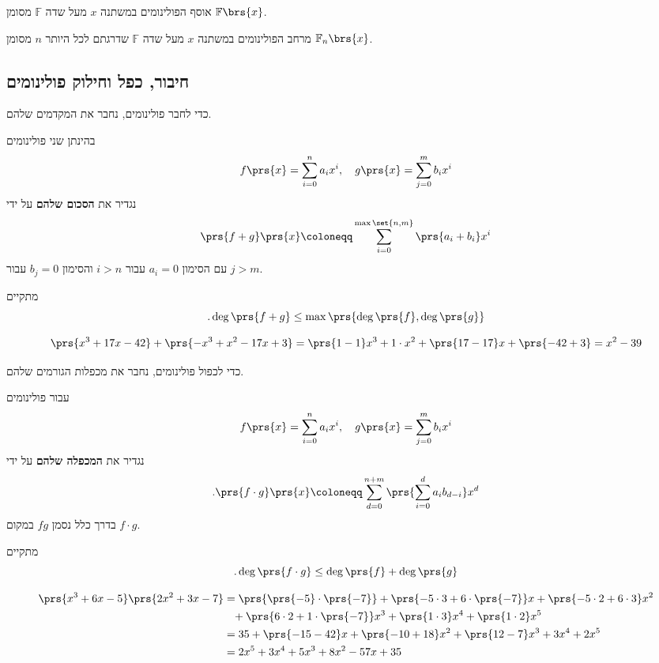 \documentclass[article, 10pt,oneside]{article}
\renewcommand{\emph}[1]{\textbf{#1}}
\begin{document}
\begin{notation}
אוסף הפולינומים במשתנה
$x$
מעל שדה
$\mathbb{F}$
מסומן
$\mathbb{F}\brs{x}$.
\end{notation}

\begin{notation}
מרחב הפולינומים במשתנה
$x$
מעל שדה
$\mathbb{F}$
שדרגתם לכל היותר
$n$
מסומן
$\mathbb{F}_n\brs{x}$.
\end{notation}

\subsection*{חיבור, כפל וחילוק פולינומים}

כדי לחבר פולינומים, נחבר את המקדמים שלהם.

\begin{definition}
בהינתן שני פולינומים
\[f\prs{x} = \sum_{i = 0}^n a_i x^i, \quad g\prs{x} = \sum_{j=0}^m b_i x^i\]
נגדיר את
\emph{הסכום שלהם}
על ידי
\[\prs{f+g}\prs{x} \coloneqq \sum_{i=0}^{\max\set{n,m}} \prs{a_i + b_i} x^i\]
עם הסימון
$a_i = 0$
עבור
$i > n$
והסימון
$b_j = 0$
עבור
$j > m$.
\end{definition}

\begin{remark}
מתקיים
\[\text{.}\deg\prs{f+g} \leq \max\prs{\deg\prs{f}, \deg\prs{g}}\]
\end{remark}

\begin{example}
\[\prs{x^3 + 17x - 42} + \prs{-x^3 + x^2 - 17x + 3} = \prs{1-1}x^3 + 1 \cdot x^2 + \prs{17-17}x + \prs{-42 + 3} = x^2 - 39\]
\end{example}

כדי לכפול פולינומים, נחבר את מכפלות הגורמים שלהם.

\begin{definition}
עבור פולינומים
\[f\prs{x} = \sum_{i = 0}^n a_i x^i, \quad g\prs{x} = \sum_{j = 0}^m b_i x^i\]
נגדיר את
\emph{המכפלה שלהם}
על ידי
\[\text{.} \prs{f \cdot g}\prs{x} \coloneqq \sum_{d = 0}^{n+m} \prs{\sum_{i = 0}^d a_i b_{d-i}} x^d\]
בדרך כלל נסמן
$fg$
במקום
$f \cdot g$.
\end{definition}

\begin{remark}
מתקיים
\[\text{.} \deg\prs{f \cdot g} \leq \deg\prs{f} + \deg\prs{g}\]
\end{remark}

\begin{example}
\begin{align*}
\prs{x^3 + 6x - 5} \prs{2 x^2 + 3 x - 7} &=
\prs{\prs{-5} \cdot \prs{-7}} + \prs{-5 \cdot 3 + 6 \cdot \prs{-7}} x + \prs{-5 \cdot 2 + 6 \cdot 3} x^2 \\&\phantom{=} + \prs{6 \cdot 2 + 1 \cdot \prs{-7}} x^3 + \prs{1 \cdot 3} x^4 + \prs{1 \cdot 2} x^5
\\&=
35 + \prs{-15-42} x + \prs{-10 + 18} x^2 + \prs{12 - 7} x^3 + 3 x^4 + 2 x^5
\\&=
2x^5 + 3x^4 + 5 x^3 + 8 x^2 - 57 x + 35 
\end{align*}
\end{example}
\end{document}
